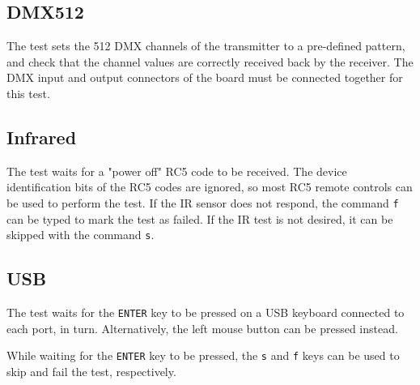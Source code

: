 \documentclass[a4paper,11pt]{article}
\begin{document}
\subsection{DMX512}
The test sets the 512 DMX channels of the transmitter to a pre-defined pattern, and check that the channel values are correctly received back by the receiver. The DMX input and output connectors of the board must be connected together for this test.

\subsection{Infrared}
The test waits for a "power off" RC5 code to be received. The device identification bits of the RC5 codes are ignored, so most RC5 remote controls can be used to perform the test. If the IR sensor does not respond, the command \verb!f! can be typed to mark the test as failed. If the IR test is not desired, it can be skipped with the command \verb!s!.

\subsection{USB}
The test waits for the \verb!ENTER! key to be pressed on a USB keyboard connected to each port, in turn. Alternatively, the left mouse button can be pressed instead.

While waiting for the \verb!ENTER! key to be pressed, the \verb!s! and \verb!f! keys can be used to skip and fail the test, respectively.
\end{document}

